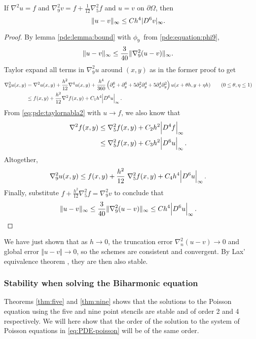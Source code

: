 \begin{theorem}\label{thm:nine}
If $\nabla^2 u = f$ and $\nabla_9^2 v = f + \frac{1}{12} \nabla_5^2 f$ and $u = v$ on $\partial \Omega$, then
$$
\lVert u - v \rVert_\infty \leq C h^4 \lvert D^6 v\rvert_\infty.
$$
\end{theorem}
\begin{proof}
By lemma \ref{pde:lemma:bound} with $\phi_9$ from \ref{pde:equation:phi9},
$$
\lVert u - v \rVert_\infty \leq \frac{3}{40} \lVert \nabla_9^2 (u  - v) \rVert_\infty.
$$
Taylor expand all terms in $\nabla_9^2 u$ around $(x,y)$ as in the former proof to get
\begin{align*}
  \nabla_9^2 u(x,y) &= \nabla^2 u(x,y) + \frac{h^2}{12} \nabla^4 u(x,y) + \frac{h^4}{360} \left( \partial_x^6 + \partial_y^6 + 5 \partial_x^2 \partial_y^4 + 5 \partial_x^4 \partial_y^2 \right) u(x + \theta h,y + \eta h) \qquad (0 \leq \theta, \eta \leq 1) \\
                    &\leq f(x,y)       + \frac{h^2}{12} \nabla^2 f(x,y) + C_1 h^4 \abs{D^6 u}_\infty.
\end{align*}
From \cref{eq:pde:taylornabla2} with $u \rightarrow f$, we also know that
\begin{align*}
	\nabla^2 f(x,y) &\leq \nabla_5^2 f(x,y) + C_2 h^2 \abs{D^4 f}_\infty \\
	                &\leq \nabla_5^2 f(x,y) + C_3 h^2 \abs{D^6 u}_\infty.
\end{align*}
Altogether,
\begin{equation*}
	\nabla_9^2 u(x,y) \leq f(x,y) + \frac{h^2}{12} \nabla_5^2 f(x,y) + C_4 h^4 \abs{D^6 u}_\infty.
\end{equation*}
Finally, substitute $f + \frac{h^2}{12} \nabla_5^2 f = \nabla_9^2 v$ to conclude that
\begin{equation*}
  \lVert u-v \rVert_\infty \leq \frac{3}{40} \lVert \nabla_9^2 (u - v) \rVert_\infty \leq C h^4 \abs{D^6 u}_\infty. \qedhere
\end{equation*}
\end{proof}

We have just shown that as $h \rightarrow 0$, the truncation error $\nabla_n^2 (u - v) \rightarrow 0$ and global error $\Vert u - v \Vert \rightarrow 0$, so the schemes are consistent and convergent.
By Lax' equivalence theorem \cite{owren}, they are then also stable.

\subsubsection{Stability when solving the Biharmonic equation}
Theorems \ref{thm:five} and \ref{thm:nine} shows that the solutions to the Poisson equation using the five and nine point stencils are stable and of order 2 and 4 respectively.
We will here show that the order of the solution to the system of Poisson equations in \eqref{eq:PDE-poisson} will be of the same order.

